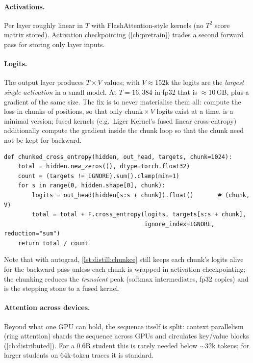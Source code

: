 \paragraph{Activations.} Per layer roughly linear in $T$ with FlashAttention-style kernels
(no $T^2$ score matrix stored). Activation checkpointing (\cref{ch:pretrain}) trades a second
forward pass for storing only layer inputs.

\paragraph{Logits.} The output layer produces $T\times V$ values; with $V\approx 152$k the logits
are the \emph{largest single activation} in a small model. At $T=16{,}384$ in fp32 that is
$\approx 10$\,GB, plus a gradient of the same size. The fix is to never materialise them all:
compute the loss in chunks of positions, so that only $\text{chunk}\times V$ logits exist at a
time.  is a minimal version; fused kernels (e.g.\ Liger Kernel's fused
linear cross-entropy) additionally compute the gradient inside the chunk loop so that the chunk
need not be kept for backward.

\begin{lstlisting}[caption={Chunked cross-entropy: peak logit memory is
\texttt{chunk}$\times V$ instead of $T\times V$.},label={lst:distill:chunkce}]
def chunked_cross_entropy(hidden, out_head, targets, chunk=1024):
    total = hidden.new_zeros((), dtype=torch.float32)
    count = (targets != IGNORE).sum().clamp(min=1)
    for s in range(0, hidden.shape[0], chunk):
        logits = out_head(hidden[s:s + chunk]).float()       # (chunk, V)
        total = total + F.cross_entropy(logits, targets[s:s + chunk],
                                        ignore_index=IGNORE, reduction="sum")
    return total / count
\end{lstlisting}

Note that with autograd, \cref{lst:distill:chunkce} still keeps each chunk's logits alive for the
backward pass unless each chunk is wrapped in activation checkpointing; the chunking reduces the
\emph{transient} peak (softmax intermediates, fp32 copies) and is the stepping stone to a fused
kernel.

\paragraph{Attention across devices.} Beyond what one GPU can hold, the sequence itself is
split: context parallelism (ring attention) shards the sequence across GPUs and circulates
key/value blocks (\cref{ch:distributed}). For a 0.6B student this is rarely needed below
$\sim$32k tokens; for larger students on 64k-token traces it is standard.


